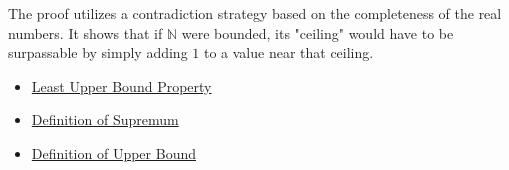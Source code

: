 \begin{remark*}
The proof utilizes a contradiction strategy based on the completeness of the real numbers. It shows that if $\mathbb{N}$ were bounded, its "ceiling" would have to be surpassable by simply adding $1$ to a value near that ceiling.
\end{remark*}

\begin{dependencies}
\begin{itemize}
  \item \hyperref[def:least-upper-bound-property]{Least Upper Bound Property}
  \item \hyperref[def:supremum]{Definition of Supremum}
  \item \hyperref[def:upper-bound]{Definition of Upper Bound}
\end{itemize}
\end{dependencies}

\clearpage
